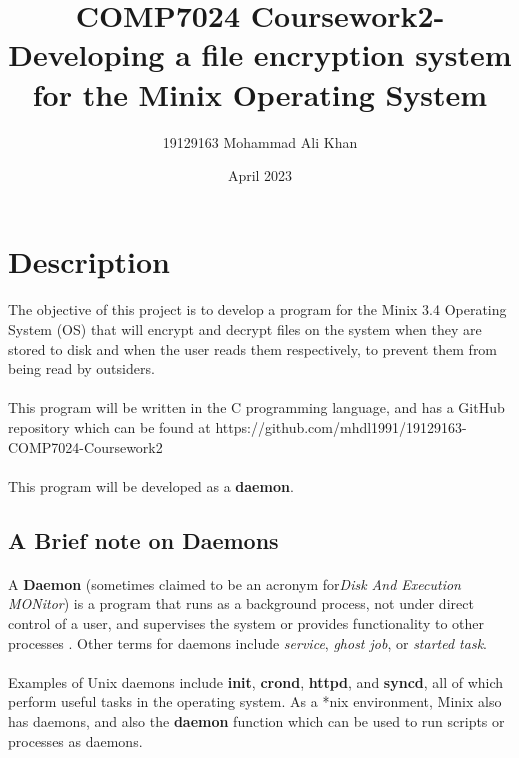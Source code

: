 \documentclass{article}
\title{COMP7024 Coursework2- Developing a file encryption system for the Minix Operating System}
\author{19129163 Mohammad Ali Khan}
\date{April 2023}
\begin{document}
    \setmainfont{Arial}
    
    \newpage
    \maketitle

\section{Description}
    \paragraph{}The objective of this project is to develop a program for the Minix 3.4 Operating System (OS) that will encrypt and decrypt files on the system when they are stored to disk and when the user reads them respectively, to prevent them from being read by outsiders.
    \paragraph{}This program will be written in the C programming language, and has a GitHub repository which can be found at https://github.com/mhdl1991/19129163-COMP7024-Coursework2
    \paragraph{}This program will be developed as a \textbf{daemon}.

\subsection{A Brief note on Daemons}
    \paragraph{}A \textbf{Daemon} (sometimes claimed to be an acronym for\textit{Disk And Execution MONitor}) is a program that runs as a background process, not under direct control of a user, and supervises the system or provides functionality to other processes . Other terms for daemons include \textit{service}, \textit{ghost job}, or \textit{started task}.
    \paragraph{}Examples of Unix daemons include \textbf{init}, \textbf{crond}, \textbf{httpd}, and \textbf{syncd}, all of which perform useful tasks in the operating system. As a *nix environment, Minix also has daemons, and also the \textbf{daemon} function which can be used to run scripts or processes as daemons.
\end{document}
